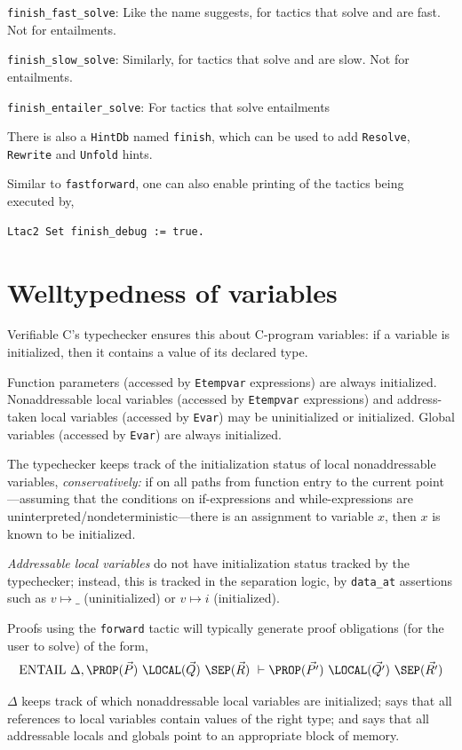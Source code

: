 \documentclass[12pt,fleqn,openany,oneside,showtrims]{memoir}
\newcommand{\ychapter}[2]{\chapter[#1]{#1}}
\begin{document}
\lstinline{finish_fast_solve}: Like the name suggests, for tactics that solve and are
  fast. Not for entailments.

\lstinline{finish_slow_solve}: Similarly, for tactics that solve and are slow. Not
  for entailments.

\lstinline{finish_entailer_solve}: For tactics that solve entailments

There is also a \lstinline{HintDb} named \lstinline{finish}, which can be used to add
\lstinline{Resolve}, \lstinline{Rewrite} and \lstinline{Unfold} hints.

Similar to \lstinline{fastforward}, one can also enable printing of the tactics being
executed by,
\begin{lstlisting}
Ltac2 Set finish_debug := true.
\end{lstlisting}

\ychapter{Welltypedness of variables}{}
\label{refcard:tcval2}

Verifiable C's typechecker ensures this about
C-program variables: if a variable is initialized, then it contains
a value of its declared type.

Function parameters (accessed by
\lstinline{Etempvar} expressions)
are always initialized.
Nonaddressable local variables (accessed by
\lstinline{Etempvar} expressions) and address-taken local variables
(accessed by \lstinline{Evar})
may be uninitialized or initialized.
Global variables (accessed by \lstinline{Evar}) are always
initialized.

The typechecker keeps track of the
initialization status of local nonaddressable
variables, \emph{conservatively:}
if on all paths from function entry to the current
point---assuming that the conditions on if-expressions
and while-expressions are uninterpreted/nondeterministic---there
is an assignment to variable $x$, then $x$ is known to
be initialized.

\emph{Addressable local variables} do not
have initialization status tracked by the typechecker;
instead, this is tracked in the separation logic,
by \lstinline{data_at} assertions such as $v \mapsto \_$
(uninitialized)
or $v \mapsto i$ (initialized).

Proofs using the \lstinline{forward} tactic will typically
generate proof obligations (for the user to solve)
of the form,
\[
\mathrm{ENTAIL}~\Delta,
\PROP(\vec{P})~
\LOCAL(\vec{Q})~
\SEP(\vec{R})
~\vdash
\PROP(\vec{P'})~
\LOCAL(\vec{Q'})~
\SEP(\vec{R'})
\]

$\Delta$
keeps track of which nonaddressable local variables are initialized;
says that all references to local variables
contain values of the right type;
and says that all addressable locals and globals point
to an appropriate block of memory.
\end{document}
